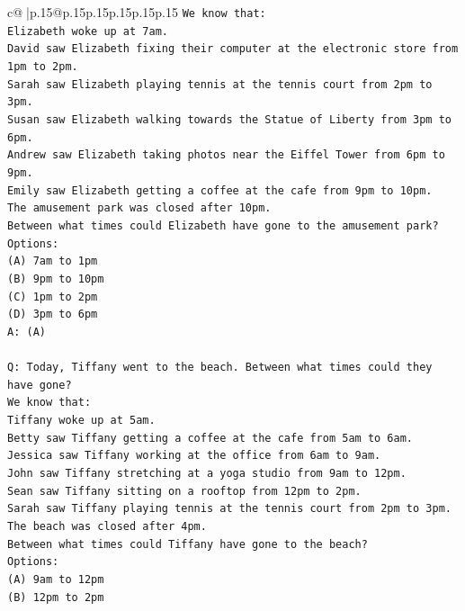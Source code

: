 \documentclass{article}
\begin{document}
{\begin{supertabular}{c@{$\;$}|p{.15\linewidth}@{}p{.15\linewidth}p{.15\linewidth}p{.15\linewidth}p{.15\linewidth}p{.15\linewidth}}
{{{\texttt{We know that:} \\
\texttt{Elizabeth woke up at 7am.} \\
\texttt{David saw Elizabeth fixing their computer at the electronic store from 1pm to 2pm.} \\
\texttt{Sarah saw Elizabeth playing tennis at the tennis court from 2pm to 3pm.} \\
\texttt{Susan saw Elizabeth walking towards the Statue of Liberty from 3pm to 6pm.} \\
\texttt{Andrew saw Elizabeth taking photos near the Eiffel Tower from 6pm to 9pm.} \\
\texttt{Emily saw Elizabeth getting a coffee at the cafe from 9pm to 10pm.} \\
\texttt{The amusement park was closed after 10pm.} \\
\texttt{Between what times could Elizabeth have gone to the amusement park?} \\
\texttt{Options:} \\
\texttt{(A) 7am to 1pm} \\
\texttt{(B) 9pm to 10pm} \\
\texttt{(C) 1pm to 2pm} \\
\texttt{(D) 3pm to 6pm} \\
\texttt{A: (A)} \\
\\ 
\texttt{Q: Today, Tiffany went to the beach. Between what times could they have gone?} \\
\texttt{We know that:} \\
\texttt{Tiffany woke up at 5am.} \\
\texttt{Betty saw Tiffany getting a coffee at the cafe from 5am to 6am.} \\
\texttt{Jessica saw Tiffany working at the office from 6am to 9am.} \\
\texttt{John saw Tiffany stretching at a yoga studio from 9am to 12pm.} \\
\texttt{Sean saw Tiffany sitting on a rooftop from 12pm to 2pm.} \\
\texttt{Sarah saw Tiffany playing tennis at the tennis court from 2pm to 3pm.} \\
\texttt{The beach was closed after 4pm.} \\
\texttt{Between what times could Tiffany have gone to the beach?} \\
\texttt{Options:} \\
\texttt{(A) 9am to 12pm} \\
\texttt{(B) 12pm to 2pm} \\
}}}
\end{supertabular}}
\end{document}
